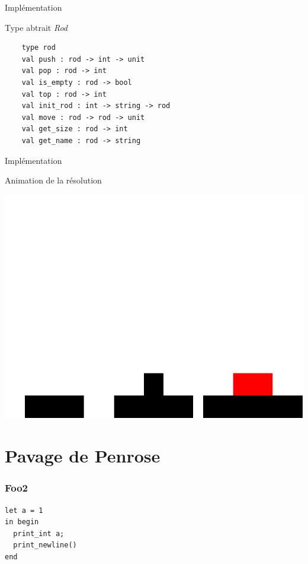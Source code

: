 \documentclass[usenames,dvipsnames,serif,14pt]{beamer}%
\begin{document}
\begin{frame}[fragile]{Implémentation}
  \begin{block}{Type abtrait \textit{Rod}}
    \begin{verbatim}
    type rod
    val push : rod -> int -> unit
    val pop : rod -> int
    val is_empty : rod -> bool
    val top : rod -> int
    val init_rod : int -> string -> rod
    val move : rod -> rod -> unit
    val get_size : rod -> int
    val get_name : rod -> string
    \end{verbatim}
  \end{block}
\end{frame}

\begin{frame}{Implémentation}
  \begin{block}{Animation de la résolution}
    \begin{center}
    \includegraphics[scale=0.2]{anim_hanoi.png}
    \end{center}
  \end{block}
\end{frame}

\section{Pavage de Penrose}
\begin{frame}[fragile]%
\frametitle{Foo2}
\begin{verbatim}
let a = 1
in begin
  print_int a;
  print_newline()
end
\end{verbatim}
\end{frame}
\end{document}
